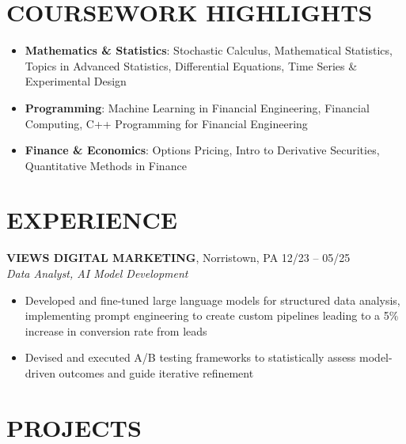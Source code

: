 \documentclass[10pt, letterpaper]{article}
\begin{document}
\section{COURSEWORK HIGHLIGHTS}

\begin{itemize}
  \item \textbf{Mathematics \& Statistics}: Stochastic Calculus, Mathematical Statistics, Topics in Advanced Statistics, Differential Equations, Time Series \& Experimental Design 
  \item \textbf{Programming}: Machine Learning in Financial Engineering, Financial Computing, C++ Programming for Financial Engineering
  \item \textbf{Finance \& Economics}: Options Pricing, Intro to Derivative Securities, Quantitative Methods in Finance
\end{itemize}

\section{EXPERIENCE}

\textbf{VIEWS DIGITAL MARKETING}, Norristown, PA \hfill 12/23 -- 05/25 \\
\textit{Data Analyst, AI Model Development}
\begin{itemize}
  \item Developed and fine-tuned large language models for structured data analysis, implementing prompt engineering to create custom pipelines leading to a 5\% increase in conversion rate from leads
  \item Devised and executed A/B testing frameworks to statistically assess model-driven outcomes and guide iterative refinement
\end{itemize}

\section{PROJECTS}




\end{document}
